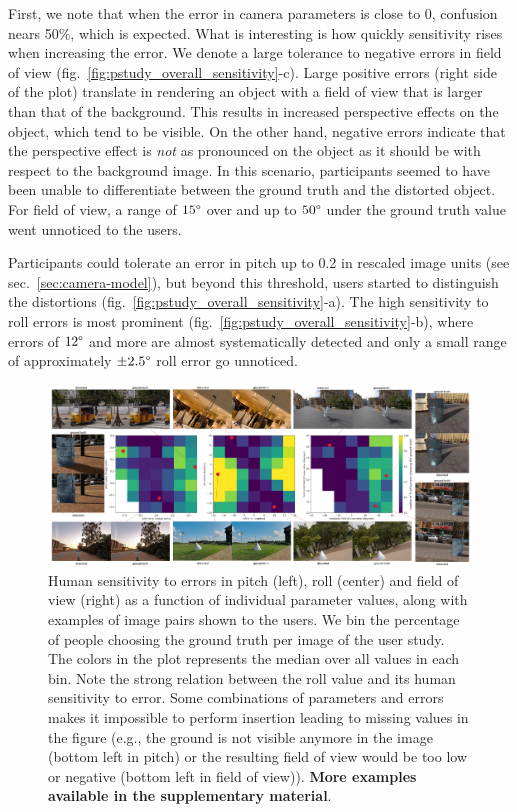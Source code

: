 First, we note that when the error in camera parameters is close to 0, confusion nears 50\%, which is expected. What is interesting is how quickly sensitivity rises when increasing the error. We denote a large tolerance to negative errors in field of view (fig.~\ref{fig:pstudy_overall_sensitivity}-c). Large positive errors (right side of the plot) translate in rendering an object with a field of view that is larger than that of the background. This results in increased perspective effects on the object, which tend to be visible. On the other hand, negative errors indicate that the perspective effect is \emph{not} as pronounced on the object as it should be with respect to the background image. In this scenario, participants seemed to have been unable to differentiate between the ground truth and the distorted object. For field of view, a range of $15\degree$ over and up to $50\degree$ under the ground truth value went unnoticed to the users.

Participants could tolerate an error in pitch up to 0.2 in rescaled image units (see sec.~\ref{sec:camera-model}), but beyond this threshold, users started to distinguish the distortions (fig.~\ref{fig:pstudy_overall_sensitivity}-a). The high sensitivity to roll errors is most prominent (fig.~\ref{fig:pstudy_overall_sensitivity}-b), where errors of $12\degree$ and more are almost systematically detected and only a small range of approximately $\pm2.5\degree$ roll error go unnoticed.


\begin{figure}
\centering
\includegraphics[width=\linewidth]{figures/pstudy/pstudy.pdf}
\caption{Human sensitivity to errors in pitch (left), roll (center) and field of view (right) as a function of individual parameter values, along with examples of image pairs shown to the users. We bin the percentage of people choosing the ground truth per image of the user study. The colors in the plot represents the median over all values in each bin. Note the strong relation between the roll value and its human sensitivity to error. Some combinations of parameters and errors makes it impossible to perform insertion leading to missing values in the figure (e.g., the ground is not visible anymore in the image (bottom left in pitch) or the resulting field of view would be too low or negative (bottom left in field of view)). \textbf{More examples available in the supplementary material}.}
\label{fig:pstudy_sensitivity_per_parameter}
\end{figure}

